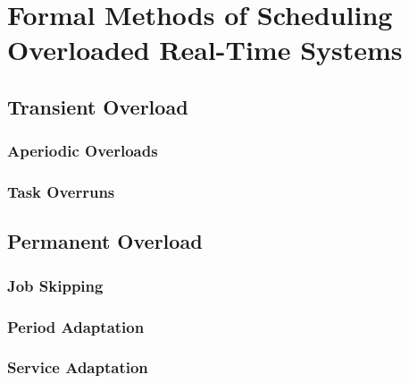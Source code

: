 \chapter{Formal Methods of Scheduling Overloaded Real-Time Systems}
\section{Transient Overload}
\subsection{Aperiodic Overloads}
\subsection{Task Overruns}
\section{Permanent Overload}
\subsection{Job Skipping}
\subsection{Period Adaptation}
\subsection{Service Adaptation}